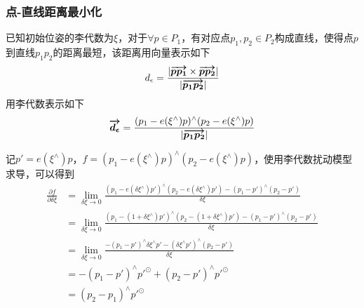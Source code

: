 \documentclass{ctexart}
\begin{document}
{	\subsubsection{点-直线距离最小化}
	已知初始位姿的李代数为$\xi$，对于$\forall p \in P_1$，有对应点$p_1,p_2 \in P_2$构成直线，使得点$p$到直线$p_1p_2$的距离最短，该距离用向量表示如下
	\begin{equation}
	d_{\epsilon} =
	\frac{|\boldmath\overrightarrow{p p_1}\unboldmath \times \boldmath\overrightarrow{p p_2}\unboldmath|}{|\boldmath\overrightarrow{p_1 p_2}\unboldmath|}
	\end{equation}
	用李代数表示如下
	\begin{equation}
	\boldmath\overrightarrow{d_{\epsilon}}\unboldmath =
	\frac{(p_1-e(\xi ^\wedge)p)^\wedge(p_2-e(\xi ^\wedge)p)}{|\boldmath\overrightarrow{p_1 p_2}\unboldmath|}
	\end{equation}
	\par 记$p'=e(\xi ^\wedge)p$，$f=(p_1-e(\xi ^\wedge)p) ^\wedge (p_2-e(\xi ^\wedge)p)$，使用李代数扰动模型求导，可以得到
	\begin{equation}
	\begin{split}
	\frac{\partial f}{\partial \delta \xi}
	&=
	\lim\limits_{\delta \xi \rightarrow 0}
	\frac{(p_1-e(\delta \xi ^\wedge) p') 
	^\wedge 
	(p_2-e(\delta \xi ^\wedge) p')
	-
	(p_1-p') ^\wedge (p_2-p')
	}{\delta \xi} \\
	&=
	\lim\limits_{\delta \xi \rightarrow 0}
	\frac{(p_1-(1+\delta \xi ^\wedge) p') 
		^\wedge 
		(p_2-(1+\delta \xi ^\wedge) p')
		-
		(p_1-p') ^\wedge (p_2-p')
	}{\delta \xi} \\
	&=
	\lim\limits_{\delta \xi \rightarrow 0}
	\frac{-(p_1-p')^\wedge\delta\xi^\wedge p'- (\delta\xi^\wedge p')^\wedge(p_2-p')}{\delta \xi} \\
	&=
	- (p_1-p')^\wedge p'^\odot + (p_2-p')^\wedge p'^\odot \\
	&=
	(p_2 - p_1)^\wedge p'^\odot
	\end{split}
	\end{equation}
	
}
\end{document}
